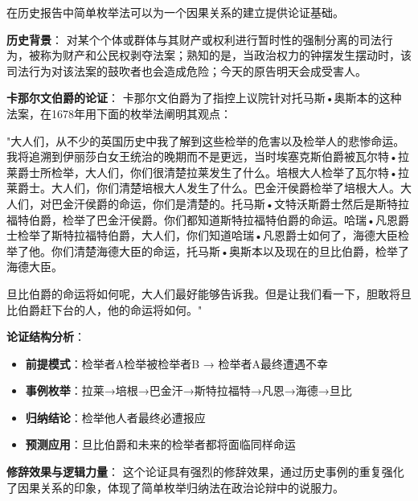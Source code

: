 \begin{examplebox}[title=历史推理中的简单枚举归纳法：卡那尔文伯爵的经典案例]
在历史报告中简单枚举法可以为一个因果关系的建立提供论证基础。

\textbf{历史背景}：
对某个个体或群体与其财产或权利进行暂时性的强制分离的司法行为，被称为财产和公民权剥夺法案；熟知的是，当政治权力的钟摆发生摆动时，该司法行为对该法案的鼓吹者也会造成危险；今天的原告明天会成受害人。

\textbf{卡那尔文伯爵的论证}：
卡那尔文伯爵为了指控上议院针对托马斯•奥斯本的这种法案，在1678年用下面的枚举法阐明其观点：

"大人们，从不少的英国历史中我了解到这些检举的危害以及检举人的悲惨命运。我将追溯到伊丽莎白女王统治的晚期而不是更远，当时埃塞克斯伯爵被瓦尔特•拉莱爵士所检举，大人们，你们很清楚拉莱发生了什么。培根大人检举了瓦尔特•拉莱爵士。大人们，你们清楚培根大人发生了什么。巴金汗侯爵检举了培根大人。大人们，对巴金汗侯爵的命运，你们是清楚的。托马斯•文特沃斯爵士然后是斯特拉福特伯爵，检举了巴金汗侯爵。你们都知道斯特拉福特伯爵的命运。哈瑞•凡恩爵士检举了斯特拉福特伯爵，大人们，你们知道哈瑞•凡恩爵士如何了，海德大臣检举了他。你们清楚海德大臣的命运，托马斯•奥斯本以及现在的旦比伯爵，检举了海德大臣。

旦比伯爵的命运将如何呢，大人们最好能够告诉我。但是让我们看一下，胆敢将旦比伯爵赶下台的人，他的命运将如何。"\cite{roberts1966}

\textbf{论证结构分析}：
\begin{itemize}
\item \textbf{前提模式}：检举者A检举被检举者B → 检举者A最终遭遇不幸
\item \textbf{事例枚举}：拉莱→培根→巴金汗→斯特拉福特→凡恩→海德→旦比
\item \textbf{归纳结论}：检举他人者最终必遭报应
\item \textbf{预测应用}：旦比伯爵和未来的检举者都将面临同样命运
\end{itemize}

\textbf{修辞效果与逻辑力量}：
这个论证具有强烈的修辞效果，通过历史事例的重复强化了因果关系的印象，体现了简单枚举归纳法在政治论辩中的说服力。
\end{examplebox}

